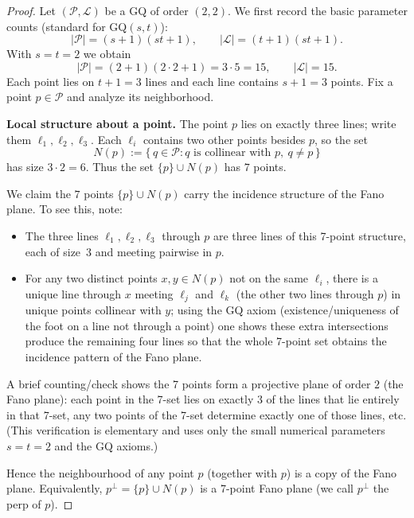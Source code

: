 \documentclass[12pt,a4paper,openany]{book}
\begin{document}
\begin{proof}
Let $(\mathcal P,\mathcal L)$ be a GQ of order $(2,2)$. We first record the basic parameter counts (standard for GQ$(s,t)$):
\[
|\mathcal P|=(s+1)(st+1),\qquad |\mathcal L|=(t+1)(st+1).
\]
With $s=t=2$ we obtain
\[
|\mathcal P|= (2+1)(2\cdot 2+1)=3\cdot 5=15,\qquad |\mathcal L|=15.
\]
Each point lies on $t+1=3$ lines and each line contains $s+1=3$ points. Fix a point $p\in\mathcal P$ and analyze its neighborhood.

\medskip\noindent\textbf{Local structure about a point.}
The point $p$ lies on exactly three lines; write them $\ell_1,\ell_2,\ell_3$. Each $\ell_i$ contains two other points besides $p$, so the set
\[
N(p):=\{\, q\in\mathcal P : q\text{ is collinear with }p,\ q\neq p\,\}
\]
has size $3\cdot 2=6$. Thus the set $\{p\}\cup N(p)$ has $7$ points.

We claim the $7$ points $\{p\}\cup N(p)$ carry the incidence structure of the Fano plane. To see this, note:

\begin{itemize}
\item The three lines $\ell_1,\ell_2,\ell_3$ through $p$ are three lines of this 7-point structure, each of size~$3$ and meeting pairwise in $p$.
\item For any two distinct points $x,y\in N(p)$ not on the same $\ell_i$, there is a unique line through $x$ meeting $\ell_j$ and $\ell_k$ (the other two lines through $p$) in unique points collinear with $y$; using the GQ axiom (existence/uniqueness of the foot on a line not through a point) one shows these extra intersections produce the remaining four lines so that the whole 7-point set obtains the incidence pattern of the Fano plane.
\end{itemize}

A brief counting/check shows the 7 points form a projective plane of order $2$ (the Fano plane): each point in the 7-set lies on exactly 3 of the lines that lie entirely in that 7-set, any two points of the 7-set determine exactly one of those lines, etc. (This verification is elementary and uses only the small numerical parameters $s=t=2$ and the GQ axioms.)

Hence the neighbourhood of any point $p$ (together with $p$) is a copy of the Fano plane. Equivalently, $p^\perp=\{p\}\cup N(p)$ is a 7-point Fano plane (we call $p^\perp$ the perp of $p$).


\end{proof}
\end{document}
